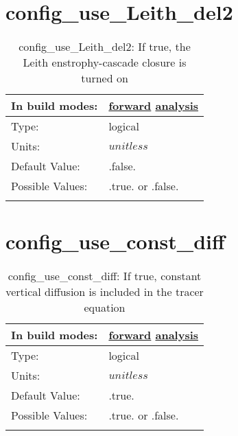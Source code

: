 \section[config\_use\_Leith\_del2]{config\_use\_Leith\_del2}
\label{sec:nm_sec_config_use_Leith_del2}
\begin{center}
\begin{longtable}{| p{2.0in} || p{4.0in} |}
    \hline
    In build modes: & \hyperref[subsec:forward_nm_tab_hmix_Leith]{forward} \hyperref[subsec:analysis_nm_tab_hmix_Leith]{analysis} \\
    \hline
    Type: & logical \\
    \hline
    Units: & $unitless$ \\
    \hline
    Default Value: & .false. \\
    \hline
    Possible Values: & .true. or .false. \\
    \hline
    \caption{config\_use\_Leith\_del2: If true, the Leith enstrophy-cascade closure is turned on}
\end{longtable}
\end{center}
\section[config\_use\_const\_diff]{config\_use\_const\_diff}
\label{sec:nm_sec_config_use_const_diff}
\begin{center}
\begin{longtable}{| p{2.0in} || p{4.0in} |}
    \hline
    In build modes: & \hyperref[subsec:forward_nm_tab_vmix_const]{forward} \hyperref[subsec:analysis_nm_tab_vmix_const]{analysis} \\
    \hline
    Type: & logical \\
    \hline
    Units: & $unitless$ \\
    \hline
    Default Value: & .true. \\
    \hline
    Possible Values: & .true. or .false. \\
    \hline
    \caption{config\_use\_const\_diff: If true, constant vertical diffusion is included in the tracer equation}
\end{longtable}
\end{center}
